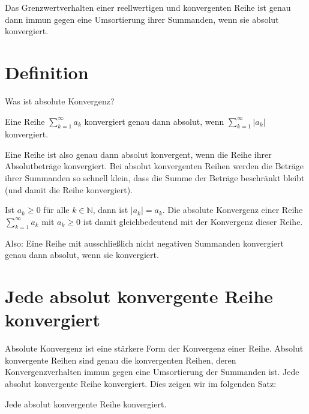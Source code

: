 \documentclass[fontsize=9pt,
               parskip=half-,
               DIV=14,
               listof=chapterentry,
               tocflat]{scrbook}
\begin{document}
\begin{importantparagraph*}
Das Grenzwertverhalten einer reellwertigen und konvergenten Reihe ist genau dann immun gegen eine Umsortierung ihrer Summanden, wenn sie absolut konvergiert.

\end{importantparagraph*}

\section{Definition}

Was ist absolute Konvergenz?

\begin{definition*}
Eine Reihe $\sum _{k=1}^{\infty }a_{k}$ konvergiert genau dann absolut, wenn $\sum _{k=1}^{\infty }|a_{k}|$ konvergiert.

\end{definition*}

Eine Reihe ist also genau dann absolut konvergent, wenn die Reihe ihrer Absolutbeträge konvergiert. Bei absolut konvergenten Reihen werden die Beträge ihrer Summanden so schnell klein, dass die Summe der Beträge beschränkt bleibt (und damit die Reihe konvergiert).

\begin{hint*}
Ist $a_{k}\geq 0$ für alle $k\in \mathbb {N} $, dann ist $|a_{k}|=a_{k}$. Die absolute Konvergenz einer Reihe $\sum _{k=1}^{\infty }a_{k}$ mit $a_{k}\geq 0$ ist damit gleichbedeutend mit der Konvergenz dieser Reihe.

Also: Eine Reihe mit ausschließlich nicht negativen Summanden konvergiert genau dann absolut, wenn sie konvergiert.

\end{hint*}

\section{Jede absolut konvergente Reihe konvergiert}

Absolute Konvergenz ist eine stärkere Form der Konvergenz einer Reihe. Absolut konvergente Reihen sind genau die konvergenten Reihen, deren Konvergenzverhalten immun gegen eine Umsortierung der Summanden ist. Jede absolut konvergente Reihe konvergiert. Dies zeigen wir im folgenden Satz:

\begin{theorem*}
Jede absolut konvergente Reihe konvergiert.

\end{theorem*}
\end{document}

